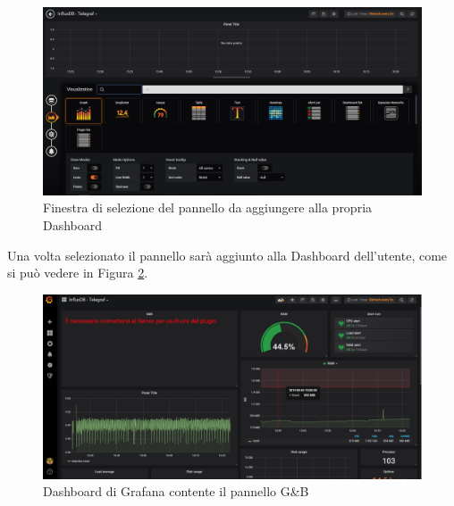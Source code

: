 \begin{figure}[H]
	\begin{center}
		\includegraphics[scale=0.37]{./images/AddPanel.png}
		 \caption{Finestra di selezione del pannello da aggiungere alla propria Dashboard}	
		 \label{AddPanelImg}
	\end{center}
\end{figure}


Una volta selezionato il pannello sarà aggiunto alla Dashboard dell'utente, come si può vedere in Figura \ref{DashboardPanel}.

\begin{figure}[H]
	\begin{center}
		\includegraphics[scale=0.37]{./images/DashboardPanel.png}
		 \caption{Dashboard di Grafana contente il pannello G\&B}	
		 \label{DashboardPanel}
	\end{center}
\end{figure}
